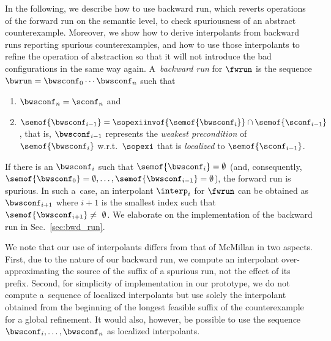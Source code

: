 {In the following, we describe how to use backward run, which reverts operations
of the forward run on the semantic level, to check spuriousness of an abstract
counterexample.
Moreover, we show how to derive interpolants from backward runs reporting
spurious counterexamples, and how to use those interpolants to refine the
operation of abstraction so that it will not introduce the bad configurations
in the same way again.
%
%
A~\emph{backward run} for $\fwrun$ 
is the sequence 
$\bwrun = \bwsconf_0 \cdots \bwsconf_n$
such that
%
\begin{enumerate}
\item
$\bwsconf_n = \sconf_n$ 
and
\item
$\semof{\bwsconf_{i-1}} = \sopexiinvof{\semof{\bwsconf_{i}}} \cap \semof{\sconf_{i-1}}$, 
that is, ${\bwsconf_{i-1}}$ represents the \emph{weakest precondition} of
$\semof{\bwsconf_{i}}$ w.r.t.~$\sopexi$ that is \emph{localized} to
$\semof{\sconf_{i-1}}$.
\end{enumerate}
%
If there is an $\bwsconf_i$ such that $\semof{\bwsconf_i} = \emptyset$ (and,
consequently, $\semof{\bwsconf_0} = \emptyset, \ldots, \semof{\bwsconf_{i-1}} =
\emptyset$), the forward run is spurious.
In such a~case,
an interpolant $\interp_i$ for $\fwrun$ can be obtained as $\bwsconf_{i+1}$ where $i+1$ is
the smallest index such that $\semof{\bwsconf_{i+1}}\neq~\emptyset$. 
%
We elaborate on the implementation of the backward run in Sec.~\ref{sec:bwd_run}.

We note that our use of interpolants differs from that of McMillan
\cite{mcmillanCAV03} in two aspects. First, due to the nature of our backward
run, we compute an interpolant over-approximating the source of the suffix of a
spurious run, not the effect of its prefix. Second, for simplicity of
implementation in our prototype, we do not compute a~sequence of localized
interpolants but use solely the interpolant obtained from the beginning of the
longest feasible suffix of the counterexample for a global refinement. 
It would also, however, be possible to use the sequence
$\bwsconf_i,\ldots,\bwsconf_n$ as localized interpolants.


}
